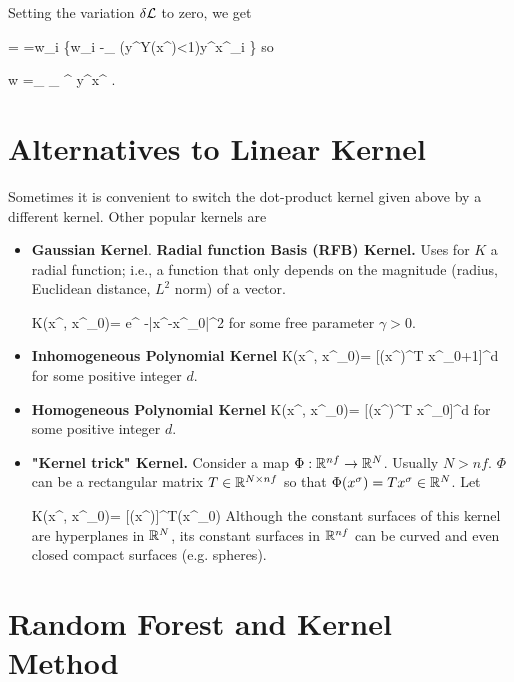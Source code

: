 Setting the variation $\delta {\cal L}$
to zero, we get

=\delta \call
=\delta w_i
\left\{w_i -\sum_\s
\indi(y^\s Y(x^\s)<1)y^\s x^\s_i
\right\}
\eeq
so

\beq
 w =\sum_\s
{}_
{\alp^\s}
y^\s x^\s
\;.
\eeq




\section{Alternatives to Linear Kernel}
Sometimes it is convenient to switch
the dot-product kernel given above by 
a different kernel.
Other popular kernels are

\begin{itemize}
\item {\bf Gaussian Kernel}.
{\bf Radial function Basis (RFB) Kernel.}
Uses for $K$ a radial function; i.e., a
function that only depends on 
the magnitude (radius, Euclidean distance,
$L^2$ norm) of a vector.

\beq
K(x^\s, x^{\s_0})=
e^{ -\gamma |x^\s-x^{\s_0}|^2}
\eeq
for some free parameter $\gamma>0$.

\item
{\bf Inhomogeneous Polynomial Kernel}
\beq
K(x^\s, x^{\s_0})=
[(x^\s)^T x^{\s_0}+1]^d
\eeq
for some positive integer $d$.

\item
{\bf Homogeneous Polynomial Kernel}
\beq
K(x^\s, x^{\s_0})=
[(x^\s)^T x^{\s_0}]^d
\eeq
for some positive integer $d$.


\item
{\bf "Kernel trick" Kernel.}
Consider a map $\Phi:{ \mathbb{R}}^{nf}\rightarrow { \mathbb{R}}^N$.
Usually $N>nf$. $\Phi$ can be a
rectangular matrix 
$T\in{ \mathbb{R}}^{N\times nf}$
so that $\Phi(x^\sigma)=Tx^\sigma\in { \mathbb{R}}^N$. Let



\beq
K(x^\s, x^{\s_0})=
[\Phi(x^\s)]^T\Phi(x^{\s_0})
\eeq
Although the constant surfaces  of 
this kernel are
hyperplanes in ${ \mathbb{R}}^N$,
its constant
surfaces in ${ \mathbb{R}}^{nf}$
can be curved and even closed 
compact surfaces (e.g. spheres).

\end{itemize}

\section{Random Forest and Kernel Method}
